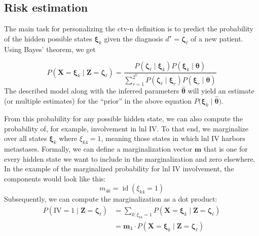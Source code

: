 \documentclass[twocolumn]{aastex631}
\begin{document}
\subsection{Risk estimation}
\label{subsec:formalism:risk}

The main task for personalizing the \gls{ctv-n} definition is to predict the probability of the hidden possible states $\boldsymbol{\xi}_k$ given the diagnosis $d^\star=\boldsymbol{\zeta}_\ell$ of a new patient. Using Bayes' theorem, we get

\begin{equation}
    P\left( \mathbf{X}=\boldsymbol{\xi}_k \mid \mathbf{Z}=\boldsymbol{\zeta}_\ell \right) = \frac{P\left( \boldsymbol{\zeta}_\ell \mid \boldsymbol{\xi}_k \right) P\left( \boldsymbol{\xi}_k \mid \boldsymbol{\theta} \right)}{\sum_{r=1}^{2^V} P\left( \boldsymbol{\zeta}_\ell \mid \boldsymbol{\xi}_r \right) P\left( \boldsymbol{\xi}_r \mid \boldsymbol{\theta} \right) }
\end{equation}
%
The described model along with the inferred parameters $\boldsymbol{\hat{\theta}}$ will yield an estimate (or multiple estimates) for the ``prior'' in the above equation $P\big( \boldsymbol{\xi}_k \mid \boldsymbol{\hat{\theta}} \big)$.

From this probability for any possible hidden state, we can also compute the probability of, for example, involvement in \gls{lnl} IV. To that end, we marginalize over all states $\boldsymbol{\xi}_k$ where $\xi_{k4} = 1$, meaning those states in which \gls{lnl} IV harbors metastases. Formally, we can define a marginalization vector $\mathbf{m}$ that is one for every hidden state we want to include in the marginalization and zero elsewhere. In the example of the marginalized probability for \gls{lnl} IV involvement, the components would look like this:
%
\begin{equation}
    m_{4k} = \operatorname{id}(\xi_{k4} = 1)
\end{equation}
%
Subsequently, we can compute the marginalization as a dot product:
%
\begin{equation}
    \begin{aligned}
        P\left(\text{IV} = 1 \mid \mathbf{Z}=\boldsymbol{\zeta}_\ell \right) &= \sum_{k:\xi_{k4} = 1} P\left( \mathbf{X}=\boldsymbol{\xi}_k \mid \mathbf{Z}=\boldsymbol{\zeta}_\ell \right) \\
        &= \mathbf{m}_4 \cdot P\left( \mathbf{X}=\boldsymbol{\xi}_k \mid \mathbf{Z}=\boldsymbol{\zeta}_\ell \right)
    \end{aligned}
\end{equation}
\end{document}
